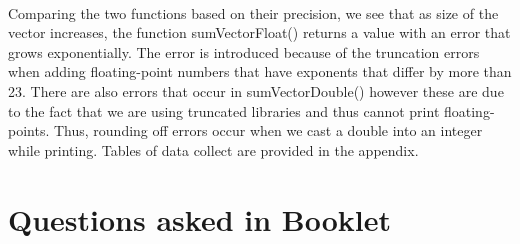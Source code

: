 \documentclass{article}
\begin{document}
\paragraph{}
Comparing the two functions based on their precision, we see that as size of the vector increases, the function sumVectorFloat() returns a value with an error that grows exponentially. The error is introduced because of the truncation errors when adding floating-point numbers that have exponents that differ by more than 23. There are also errors that occur in sumVectorDouble() however these are due to the fact that we are using truncated libraries and thus cannot print floating-points. Thus, rounding off errors occur when we cast a double into an integer while printing. Tables of data collect are provided in the appendix.  

\newpage
\section{Questions asked in Booklet}
\end{document}
